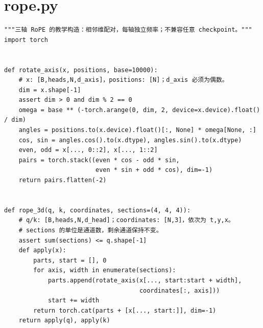 \section{rope.py}
\label{code-rope}
\begin{verbatim}
"""三轴 RoPE 的教学构造：相邻维配对，每轴独立频率；不兼容任意 checkpoint。"""
import torch


def rotate_axis(x, positions, base=10000):
    # x: [B,heads,N,d_axis]，positions: [N]；d_axis 必须为偶数。
    dim = x.shape[-1]
    assert dim > 0 and dim % 2 == 0
    omega = base ** (-torch.arange(0, dim, 2, device=x.device).float() / dim)
    angles = positions.to(x.device).float()[:, None] * omega[None, :]
    cos, sin = angles.cos().to(x.dtype), angles.sin().to(x.dtype)
    even, odd = x[..., 0::2], x[..., 1::2]
    pairs = torch.stack((even * cos - odd * sin,
                         even * sin + odd * cos), dim=-1)
    return pairs.flatten(-2)


def rope_3d(q, k, coordinates, sections=(4, 4, 4)):
    # q/k: [B,heads,N,d_head]；coordinates: [N,3]，依次为 t,y,x。
    # sections 的单位是通道数，剩余通道保持不变。
    assert sum(sections) <= q.shape[-1]
    def apply(x):
        parts, start = [], 0
        for axis, width in enumerate(sections):
            parts.append(rotate_axis(x[..., start:start + width],
                                     coordinates[:, axis]))
            start += width
        return torch.cat(parts + [x[..., start:]], dim=-1)
    return apply(q), apply(k)
\end{verbatim}

